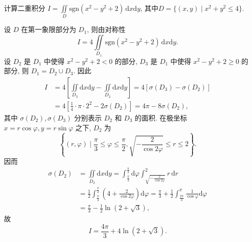 \documentclass[../../main.tex]{subfiles}%
\begin{document}
\begin{example}
计算二重积分 \( I = \iint\limits_D \text{sgn}(x^2 - y^2 + 2) \, \mathrm{d}x\mathrm{d}y \), 其中$D = \{ (x,y) \mid x^2 + y^2 \leqslant 4 \}.$
\end{example}
\begin{solution}
设 \( D \) 在第一象限部分为 \( D_1 \), 则由对称性
\[
I = 4 \iint\limits_{D_1} \text{sgn}(x^2 - y^2 + 2) \, \mathrm{d}x\mathrm{d}y.
\]
设 \( D_2 \) 是 \( D_1 \) 中使得 \( x^2 - y^2 + 2 < 0 \) 的部分, \( D_3 \) 是 \( D_1 \) 中使得 \( x^2 - y^2 + 2 \geqslant 0 \) 的部分, 则 \( D_1 = D_2 \cup D_3 \). 因此
\begin{align*}
I &= 4 \left[ \iint\limits_{D_3} \mathrm{d}x\mathrm{d}y - \iint\limits_{D_2} \mathrm{d}x\mathrm{d}y \right] = 4 [\sigma(D_3) - \sigma(D_2)]
\\
&= 4 \left[ \frac{1}{4} \cdot \pi \cdot 2^2 - 2\sigma(D_2) \right] = 4\pi - 8\sigma(D_2),
\end{align*}
其中 \( \sigma(D_2), \sigma(D_3) \) 分别表示 \( D_2 \) 和 \( D_3 \) 的面积. 在极坐标 \( x = r\cos\varphi, y = r\sin\varphi \) 之下, \( D_2 \) 为
\[
\left\{ (r,\varphi) \mid \frac{\pi}{3} \leqslant \varphi \leqslant \frac{\pi}{2}, \sqrt{-\frac{2}{\cos 2\varphi}} \leqslant r \leqslant 2 \right\}.
\]
因而
\begin{align*}
\sigma(D_2) &= \iint\limits_{D_2} \mathrm{d}x\mathrm{d}y = \int_{\frac{\pi}{3}}^{\frac{\pi}{2}} \mathrm{d}\varphi \int_{\sqrt{-\frac{2}{\cos 2\varphi}}}^2 r \, \mathrm{d}r
\\
&= \frac{1}{2} \int_{\frac{\pi}{3}}^{\frac{\pi}{2}} \left( 4 + \frac{2}{\cos 2\varphi} \right) \mathrm{d}\varphi = \frac{\pi}{3} + \frac{1}{2} \int_{\frac{2\pi}{3}}^{\pi} \frac{1}{\cos\varphi} \mathrm{d}\varphi
\\
&= \frac{\pi}{3} - \frac{1}{2} \ln(2 + \sqrt{3}),
\end{align*}
故
\[
I = \frac{4\pi}{3} + 4\ln(2 + \sqrt{3}).
\]

\end{solution}
\end{document}

